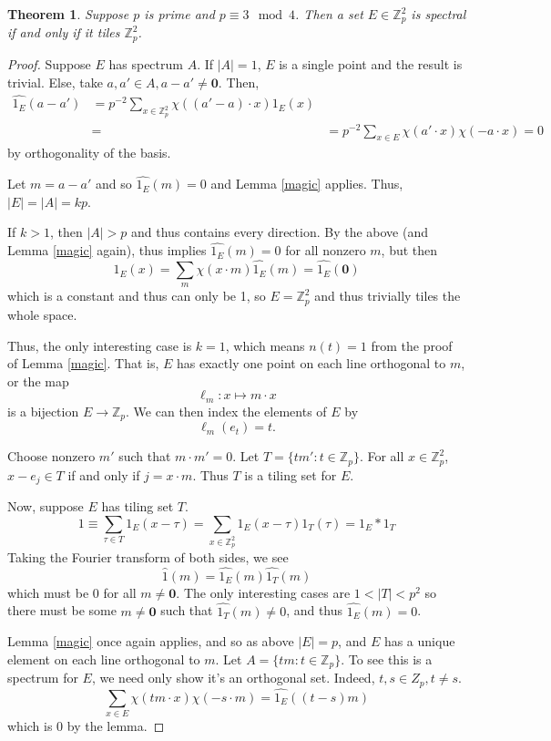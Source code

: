 \documentclass[12pt]{article}
\newcommand{\bbZ}{\mathbb{Z}}
\renewcommand{\vec}{\mathbf}
\newtheorem{theorem}{Theorem}[section]
\theoremstyle{definition}
\numberwithin{equation}{subsection}
\begin{document}
\begin{theorem}
    Suppose $p$ is prime and $p\equiv 3 \mod 4$. Then a set $E\in \bbZ_p^2$ is spectral if and only if it tiles $\bbZ_p^2$.
\end{theorem}


\begin{proof}
    Suppose $E$ has spectrum $A$. If $|A|=1$, $E$ is a single point and the result is trivial. Else, take $a,a'\in A, a-a'\neq \vec{0}$. Then, 
    \begin{align*}
        \hat{1_E}(a-a') &=p^{-2} \sum_{x\in\bbZ_p^2} \chi((a'-a)\cdot  x)1_E(x) \\
        \ &= &=p^{-2} \sum_{x\in E} \chi(a'\cdot  x) \chi(-a\cdot x) = 0
    \end{align*} by orthogonality of the basis. 

    Let $m=a-a'$ and so $\hat{1_E}(m)=0$ and Lemma \ref{magic} applies. Thus, $|E| = |A| = k p $.

    If $k>1$, then $|A| >p$ and thus contains every direction. By the above (and Lemma \ref{magic} again), thus implies $\hat{1_E}(m) = 0$ for all nonzero $m$, but then 
    \[1_E(x) = \sum_m \chi(x\cdot m)\hat{1_E}(m) = \hat{1_E}(\vec 0)\] which is a constant and thus can only be 1, so $E=\bbZ_p^2$ and thus trivially tiles the whole space. 
    
    Thus, the only interesting case is $k=1$, which means $n(t) = 1$ from the proof of Lemma \ref{magic}. That is, $E$ has exactly one point on each line orthogonal to $m$, or the map
    \[\ell_m : x\mapsto m\cdot x \] is a bijection $E\to \bbZ_p$. We can then index the elements of $E$ by \[\ell_m(e_t) = t. \]

    Choose nonzero $m'$ such that $m\cdot m'=0$. Let $T = \{ t m':t\in\bbZ_p \}$.  For all $x\in\bbZ_p^2$, $x-e_j \in T$ if and only if $j=x\cdot m$. Thus $T$ is a tiling set for $E$.  


    Now, suppose $E$ has tiling set $T$. 
        \[1\equiv \sum_{\tau\in T} 1_E(x-\tau) = \sum_{x \in \bbZ_p^2} 1_E(x-\tau)1_T(\tau) = 1_E * 1_T \]
    Taking the Fourier transform of both sides, we see
    \[\hat{1}(m) = \hat{1_E}(m) \hat{1_T}(m) \] which must be $0$ for all $m\neq\vec 0$. The only interesting cases are $1 < |T| < p^2$ so there must be some $m\neq\vec 0$ such that $\hat{1_T}(m)\neq 0$, and thus $\hat{1_E}(m) = 0$. 

    Lemma \ref{magic} once again applies, and so as above $|E|=p$, and $E$ has a unique element on each line orthogonal to $m$. Let $A = \{t m:t\in\bbZ_p\}$. To see this is a spectrum for $E$, we need only show it's an orthogonal set. Indeed, $t,s\in Z_p, t\neq s$. 
    \[\sum_{x\in E} \chi(t m\cdot x) \chi(-s\cdot m) = \hat{1_E}((t-s)m) \] which is 0 by the lemma. 

\end{proof}
\end{document}
